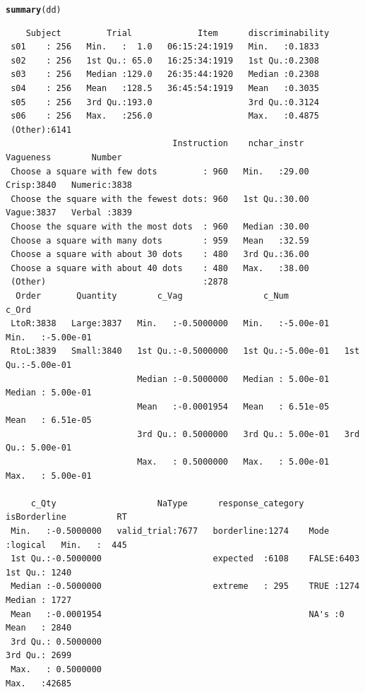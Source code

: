 \documentclass[a4paper,12pt,twoside]{article}\usepackage[]{graphicx}\usepackage[]{color}
\makeatletter
\newcommand{\hlstd}[1]{\textcolor[rgb]{0.345,0.345,0.345}{#1}}%
\newcommand{\hlkwd}[1]{\textcolor[rgb]{0.737,0.353,0.396}{\textbf{#1}}}%
\newenvironment{kframe}{%
 \def\at@end@of@kframe{}%
 \ifinner\ifhmode%
  \def\at@end@of@kframe{\end{minipage}}%
  \begin{minipage}{\columnwidth}%
 \fi\fi%
 \def\FrameCommand##1{\hskip\@totalleftmargin \hskip-\fboxsep
 \colorbox{shadecolor}{##1}\hskip-\fboxsep
     \hskip-\linewidth \hskip-\@totalleftmargin \hskip\columnwidth}%
 \MakeFramed {\advance\hsize-\width
   \@totalleftmargin\z@ \linewidth\hsize
   \@setminipage}}%
 {\par\unskip\endMakeFramed%
 \at@end@of@kframe}
\newenvironment{knitrout}{}{} %
\makeatother
\begin{document}
\begin{knitrout}\scriptsize
{}\color{fgcolor}\begin{kframe}
\begin{alltt}
\hlkwd{summary}\hlstd{(dd)}
\end{alltt}
\begin{verbatim}
    Subject         Trial             Item      discriminability
 s01    : 256   Min.   :  1.0   06:15:24:1919   Min.   :0.1833  
 s02    : 256   1st Qu.: 65.0   16:25:34:1919   1st Qu.:0.2308  
 s03    : 256   Median :129.0   26:35:44:1920   Median :0.2308  
 s04    : 256   Mean   :128.5   36:45:54:1919   Mean   :0.3035  
 s05    : 256   3rd Qu.:193.0                   3rd Qu.:0.3124  
 s06    : 256   Max.   :256.0                   Max.   :0.4875  
 (Other):6141                                                   
                                 Instruction    nchar_instr    Vagueness        Number    
 Choose a square with few dots         : 960   Min.   :29.00   Crisp:3840   Numeric:3838  
 Choose the square with the fewest dots: 960   1st Qu.:30.00   Vague:3837   Verbal :3839  
 Choose the square with the most dots  : 960   Median :30.00                              
 Choose a square with many dots        : 959   Mean   :32.59                              
 Choose a square with about 30 dots    : 480   3rd Qu.:36.00                              
 Choose a square with about 40 dots    : 480   Max.   :38.00                              
 (Other)                               :2878                                              
  Order       Quantity        c_Vag                c_Num               c_Ord          
 LtoR:3838   Large:3837   Min.   :-0.5000000   Min.   :-5.00e-01   Min.   :-5.00e-01  
 RtoL:3839   Small:3840   1st Qu.:-0.5000000   1st Qu.:-5.00e-01   1st Qu.:-5.00e-01  
                          Median :-0.5000000   Median : 5.00e-01   Median : 5.00e-01  
                          Mean   :-0.0001954   Mean   : 6.51e-05   Mean   : 6.51e-05  
                          3rd Qu.: 0.5000000   3rd Qu.: 5.00e-01   3rd Qu.: 5.00e-01  
                          Max.   : 0.5000000   Max.   : 5.00e-01   Max.   : 5.00e-01  
                                                                                      
     c_Qty                    NaType      response_category isBorderline          RT       
 Min.   :-0.5000000   valid_trial:7677   borderline:1274    Mode :logical   Min.   :  445  
 1st Qu.:-0.5000000                      expected  :6108    FALSE:6403      1st Qu.: 1240  
 Median :-0.5000000                      extreme   : 295    TRUE :1274      Median : 1727  
 Mean   :-0.0001954                                         NA's :0         Mean   : 2840  
 3rd Qu.: 0.5000000                                                         3rd Qu.: 2699  
 Max.   : 0.5000000                                                         Max.   :42685  
                                                                                           
\end{verbatim}
\end{kframe}
\end{knitrout}
\end{document}
